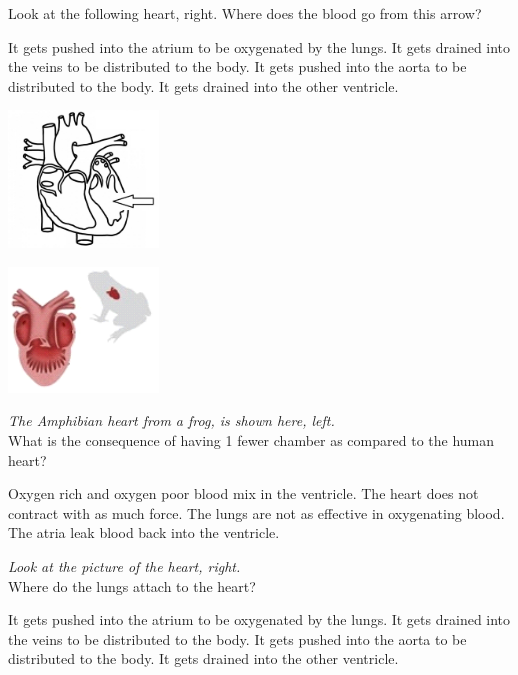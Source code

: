 \documentclass[11.5pt]{exam}
\begin{document}
\begin{questions}
\begin{multicols}{2}
\question Look at the following heart, right.  Where does the blood go from this arrow?
\begin{choices}
 \choice It gets pushed into the atrium to be oxygenated by the lungs.
 \choice It gets drained into the veins to be distributed to the body.
 \choice It gets pushed into the aorta to be distributed to the body.
 \choice It gets drained into the other ventricle.
\end{choices}
\columnbreak

\includegraphics[width=0.3\textwidth]{quiz/heart10.jpg}

\end{multicols}

\begin{multicols}{2}
\includegraphics[width=0.3\textwidth]{quiz/frog.png}
\columnbreak

\question \textit{The Amphibian heart from a frog, is shown here, left.} \\ What is the consequence of having 1 fewer chamber as compared to the human heart?
\begin{choices}
 \choice Oxygen rich and oxygen poor blood mix in the ventricle.
 \choice The heart does not contract with as much force.
 \choice The lungs are not as effective in oxygenating blood.
 \choice The atria leak blood back into the ventricle.
\end{choices}
\end{multicols}

\begin{multicols}{2}
\question \textit{Look at the picture of the heart, right.} \\ Where do the lungs attach to the heart?
\begin{choices}
 \choice It gets pushed into the atrium to be oxygenated by the lungs.
 \choice It gets drained into the veins to be distributed to the body.
 \choice It gets pushed into the aorta to be distributed to the body.
 \choice It gets drained into the other ventricle.
\end{choices}
\columnbreak


\end{multicols}
\end{questions}
\end{document}
